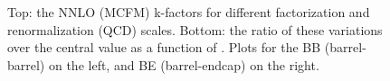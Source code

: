\begin{figure}[!htbp]{ 
\caption{Top: the NNLO (MCFM) k-factors for different factorization and renormalization (QCD) scales.
Bottom: the ratio of these variations over the central value as a function of \mgg.
Plots for the BB (barrel-barrel) on the left, and BE (barrel-endcap) on the right.}\label{Fig:sys_fs}
}\end{figure}

